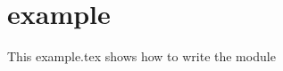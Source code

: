 \documentclass{standalone}
\begin{document}
\section{example}

This example.tex shows how to write the module
\end{document}
